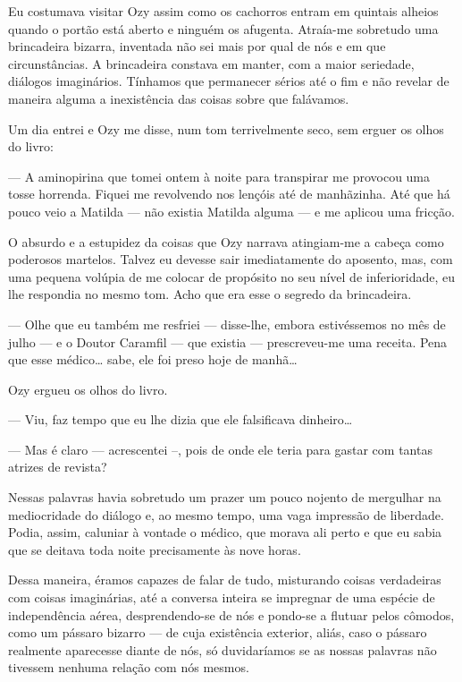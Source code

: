 Eu costumava visitar Ozy assim como os cachorros entram em quintais alheios quando o portão está aberto e ninguém os afugenta. Atraía-me sobretudo uma brincadeira bizarra, inventada não sei mais por qual de nós e em que circunstâncias. A brincadeira constava em manter, com a maior seriedade, diálogos imaginários. Tínhamos que permanecer sérios até o fim e não revelar de maneira alguma a inexistência das coisas sobre que falávamos.

Um dia entrei e Ozy me disse, num tom terrivelmente seco, sem erguer os olhos do livro:

--- A aminopirina que tomei ontem à noite para transpirar me provocou uma tosse horrenda. Fiquei me revolvendo nos lençóis até de manhãzinha. Até que há pouco veio a Matilda --- não existia Matilda alguma --- e me aplicou uma fricção.

O absurdo e a estupidez da coisas que Ozy narrava atingiam-me a cabeça como poderosos martelos. Talvez eu devesse sair imediatamente do aposento, mas, com uma pequena volúpia de me colocar de propósito no seu nível de inferioridade, eu lhe respondia no mesmo tom. Acho que era esse o segredo da brincadeira.

--- Olhe que eu também me resfriei --- disse-lhe, embora estivéssemos no mês de julho --- e o Doutor Caramfil --- que existia --- prescreveu-me uma receita. Pena que esse médico\ldots{} sabe, ele foi preso hoje de manhã\ldots{}

Ozy ergueu os olhos do livro.

--- Viu, faz tempo que eu lhe dizia que ele falsificava dinheiro\ldots{}

--- Mas é claro --- acrescentei --, pois de onde ele teria para gastar com tantas atrizes de revista?

Nessas palavras havia sobretudo um prazer um pouco nojento de mergulhar na mediocridade do diálogo e, ao mesmo tempo, uma vaga impressão de liberdade. Podia, assim, caluniar à vontade o médico, que morava ali perto e que eu sabia que se deitava toda noite precisamente às nove horas. 

Dessa maneira, éramos capazes de falar de tudo, misturando coisas verdadeiras com coisas imaginárias, até a conversa inteira se impregnar de uma espécie de independência aérea, desprendendo-se de nós e pondo-se a flutuar pelos cômodos, como um pássaro bizarro --- de cuja existência exterior, aliás, caso o pássaro realmente aparecesse diante de nós, só duvidaríamos se as nossas palavras não tivessem nenhuma relação com nós mesmos.

